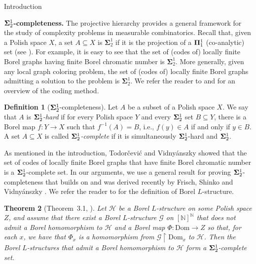 \documentclass[psamsfonts]{amsart}
\newtheorem{thm}{Theorem}[section]
\theoremstyle{definition}
\newtheorem{defn}[thm]{Definition}
\newcommand{\Dom}{\text{Dom}}
\theoremstyle{remark}
\numberwithin{equation}{section}
\newcommand\mbf{\mathbf}
\begin{document}
\begin{section}{Introduction}
\medskip

\noindent
{\bf ${\bf \Sigma}^1_2$-completeness.}
The projective hierarchy provides a general framework for the study of complexity problems in measurable combinatorics.
Recall that, given a Polish space $X$, a set $A \subseteq X$ is $\mbf{\Sigma}^1_2$ if it is the projection of a ${\bf \Pi}^1_1$ (co-analytic) set (see \cite[Chapter~V]{kechris1995}).
For example, it is easy to see that the set of (codes of) locally finite Borel graphs having finite Borel chromatic number is $\mbf{\Sigma}^1_2$.
More generally, given any local graph coloring problem, the set of (codes of) locally finite Borel graphs admitting a solution to the problem is $\mbf{\Sigma}^1_2$.
We refer the reader to \cite{moschovakis2009} and \cite[Section~1]{fsv2024} for an overview of the coding method.

\begin{defn}[${\bf \Sigma}^1_2$-completeness]
    Let $A$ be a subset of a Polish space $X$.
    We say that $A$ is \emph{${\bf \Sigma}^1_2$-hard} if for every Polish space $Y$ and every ${\bf \Sigma}^1_2$ set $B\subseteq Y$, there is a Borel map $f:Y\to X$ such that $f^{-1}(A) = B$, i.e., $f(y)\in A$ if and only if $y\in B$.
    A set $A\subseteq X$ is called \emph{${\bf \Sigma}^1_2$-complete} if it is simultaneously ${\bf \Sigma}^1_2$-hard and ${\bf \Sigma}^1_2$.
\end{defn}

As mentioned in the introduction, Todor\v{c}evi\'{c} and Vidny\'{a}nszky \cite{tv2021} showed that the set of codes of locally finite Borel graphs that have finite Borel chromatic number is a ${\bf \Sigma}^1_2$-complete set.
In our arguments, we use a general result for proving ${\bf \Sigma}^1_2$-completeness that builds on \cite{tv2021} and was derived recently by Frisch, Shinko and Vidny\'{a}nszky \cite[Theorem~3.1]{fsv2024}.
We refer the reader to \cite[Section~1]{fsv2024} for the definition of Borel $L$-structure.

\begin{thm}[Theorem~3.1, \cite{fsv2024}]\label{thm:FSV}
    Let $\mathcal{H}$ be a Borel $L$-structure on some Polish space $Z$, and assume that there exist a Borel $L$-structure $\mathcal{G}$ on $[\mathbb{N}]^\mathbb{N}$ that does not admit a Borel homomorphism to $\mathcal{H}$ and a Borel map $\Phi: \Dom\to Z$ so that, for each $x$, we have that $\Phi_x$  is a homomorphism from $\mathcal{G}\upharpoonright \Dom_x$ to $\mathcal{H}$. 
    Then the Borel $L$-structures that admit a Borel homomorphism to $\mathcal{H}$ form a ${\bf \Sigma}^1_2$-complete set.
\end{thm}


\end{section}
\end{document}

